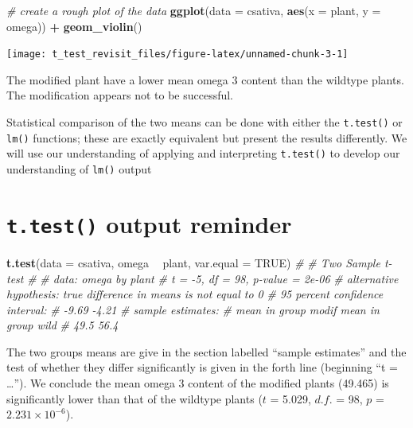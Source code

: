 \documentclass[
]{book}
\newenvironment{Shaded}{\begin{snugshade}}{\end{snugshade}}
\newcommand{\CommentTok}[1]{\textcolor[rgb]{0.56,0.35,0.01}{\textit{#1}}}
\newcommand{\DataTypeTok}[1]{\textcolor[rgb]{0.13,0.29,0.53}{#1}}
\newcommand{\KeywordTok}[1]{\textcolor[rgb]{0.13,0.29,0.53}{\textbf{#1}}}
\newcommand{\NormalTok}[1]{#1}
\newcommand{\OperatorTok}[1]{\textcolor[rgb]{0.81,0.36,0.00}{\textbf{#1}}}
\newcommand{\OtherTok}[1]{\textcolor[rgb]{0.56,0.35,0.01}{#1}}
\newcommand{\StringTok}[1]{\textcolor[rgb]{0.31,0.60,0.02}{#1}}
\begin{document}
\begin{Shaded}
\begin{Highlighting}[]
\CommentTok{# create a rough plot of the data  }
\KeywordTok{ggplot}\NormalTok{(}\DataTypeTok{data =}\NormalTok{ csativa, }\KeywordTok{aes}\NormalTok{(}\DataTypeTok{x =}\NormalTok{ plant, }\DataTypeTok{y =}\NormalTok{ omega)) }\OperatorTok{+}
\StringTok{  }\KeywordTok{geom_violin}\NormalTok{()}
\end{Highlighting}
\end{Shaded}

\begin{flushleft}\texttt{[image: t\_test\_revisit\_files/figure-latex/unnamed-chunk-3-1]} \end{flushleft}

The modified plant have a lower mean omega 3 content than the wildtype plants. The modification appears not to be successful.

Statistical comparison of the two means can be done with either the \texttt{t.test()} or \texttt{lm()} functions; these are exactly equivalent but present the results differently. We will use our understanding of applying and interpreting \texttt{t.test()} to develop our understanding of \texttt{lm()} output

\hypertarget{t.test-output-reminder}{%
\section{\texorpdfstring{\texttt{t.test()} output reminder}{t.test() output reminder}}\label{t.test-output-reminder}}

\begin{Shaded}
\begin{Highlighting}[]
\KeywordTok{t.test}\NormalTok{(}\DataTypeTok{data =}\NormalTok{ csativa, omega }\OperatorTok{~}\StringTok{ }\NormalTok{plant, }\DataTypeTok{var.equal =} \OtherTok{TRUE}\NormalTok{)}
\CommentTok{# }
\CommentTok{#   Two Sample t-test}
\CommentTok{# }
\CommentTok{# data:  omega by plant}
\CommentTok{# t = -5, df = 98, p-value = 2e-06}
\CommentTok{# alternative hypothesis: true difference in means is not equal to 0}
\CommentTok{# 95 percent confidence interval:}
\CommentTok{#  -9.69 -4.21}
\CommentTok{# sample estimates:}
\CommentTok{# mean in group modif  mean in group wild }
\CommentTok{#                49.5                56.4}
\end{Highlighting}
\end{Shaded}

The two groups means are give in the section labelled ``sample estimates'' and the test of whether they differ significantly is given in the forth line (beginning ``t = \ldots{}''). We conclude the mean omega 3 content of the modified plants (49.465) is significantly lower than that of the wildtype plants (\(t\) = 5.029, \(d.f.\) = 98, \(p\) = \ensuremath{2.231\times 10^{-6}}).
\end{document}
